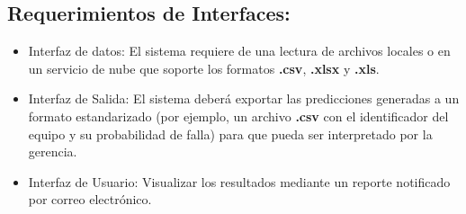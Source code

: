 \documentclass[12pt,a4paper]{article}
\begin{document}
        \subsection{\textbf{Requerimientos de Interfaces:}}
                    \begin{itemize}
                        \item Interfaz de datos: El sistema requiere de una lectura de archivos locales o en un servicio de nube que soporte los formatos \textbf{.csv}, \textbf{.xlsx} y \textbf{.xls}.
                        \item Interfaz de Salida: El sistema deberá exportar las predicciones generadas a un formato estandarizado (por ejemplo, un archivo \textbf{.csv} con el identificador del equipo y su probabilidad de falla) para que pueda ser interpretado por la gerencia.
                        \item Interfaz de Usuario: Visualizar los resultados mediante un reporte notificado por correo electrónico.
                    \end{itemize}
\end{document}
